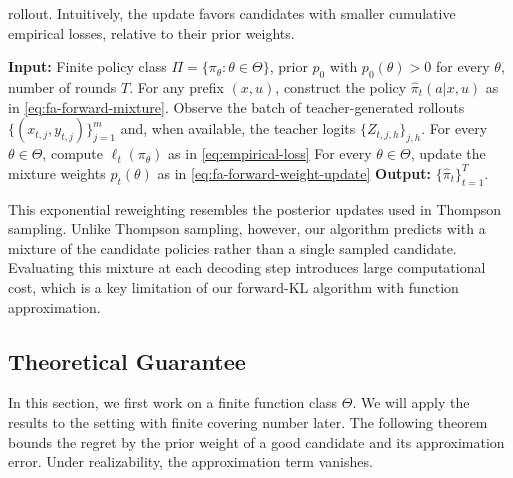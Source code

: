 \documentclass[11pt]{article}
\begin{document}
rollout. Intuitively, the update favors candidates with smaller cumulative empirical losses, relative to their prior weights.
\begin{algorithm}[H]
\caption{Forward KL with Function Approximation}
\label{algo:fa-forward}
\begin{algorithmic}[1]
    \STATE \textbf{Input:} Finite policy class
    $\Pi=\{\pi_\theta:\theta\in\Theta\}$,
    prior $p_0$ with $p_0(\theta)>0$ for every $\theta$,
    number of rounds $T$.
        \STATE For any prefix $(x,u)$, construct the policy $\hat\pi_t(a|x,u)$ as in \eqref{eq:fa-forward-mixture}.
        \STATE Observe the batch of teacher-generated rollouts
        $\{(x_{t,j},y_{t,j})\}_{j=1}^m$ and, when available, the teacher logits $\{Z_{t,j,h}\}_{j,h}$.
        \STATE For every $\theta\in\Theta$, compute $\ell_t(\pi_\theta)$ as in \eqref{eq:empirical-loss}
        \STATE For every $\theta\in \Theta$, update the mixture weights $p_t(\theta)$ as in \eqref{eq:fa-forward-weight-update}
    \ENDFOR
    \STATE \textbf{Output:} $\{\hat\pi_t\}_{t=1}^T$.
\end{algorithmic}
\end{algorithm}
This exponential reweighting resembles the posterior updates used in Thompson sampling. Unlike Thompson sampling, however, our algorithm predicts with a mixture of the candidate policies rather than a single sampled candidate. Evaluating this mixture at each decoding step introduces large computational cost, which is a key limitation of our forward-KL algorithm with function approximation.
\subsection{Theoretical Guarantee}
In this section, we first work on a finite function class $\Theta$. We will apply the results to the setting with finite covering number later. The following theorem bounds the regret by the prior weight of a good
candidate and its approximation error. Under realizability, the
approximation term vanishes.
\end{document}
